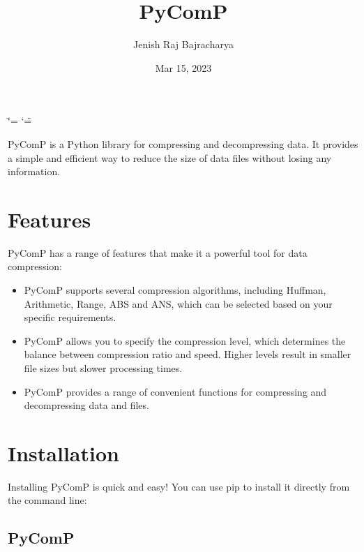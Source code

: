 \documentclass[letterpaper,10pt,english]{sphinxmanual}
\title{PyComP}
\date{Mar 15, 2023}
\author{Jenish Raj Bajracharya}
\begin{document}
\ifdefined\shorthandoff
  \ifnum\catcode`\=\string=\active\shorthandoff{=}\fi
  \ifnum\catcode`\"=\active{}\fi
\fi

\pagestyle{empty}
\sphinxmaketitle
\pagestyle{plain}
\sphinxtableofcontents
\pagestyle{normal}
\label{\detokenize{index::doc}}


\sphinxAtStartPar
PyComP is a Python library for compressing and decompressing data. It provides a simple and efficient way to reduce the size of data files without losing any information.


\chapter{Features}
\label{\detokenize{index:features}}
\sphinxAtStartPar
PyComP has a range of features that make it a powerful tool for data compression:
\begin{itemize}
\item {} 
\sphinxAtStartPar
{} PyComP supports several compression algorithms, including Huffman, Arithmetic, Range, ABS and ANS, which can be selected based on your specific requirements.

\item {} 
\sphinxAtStartPar
{} PyComP allows you to specify the compression level, which determines the balance between compression ratio and speed. Higher levels result in smaller file sizes but slower processing times.

\item {} 
\sphinxAtStartPar
{} PyComP provides a range of convenient functions for compressing and decompressing data and files.

\end{itemize}


\chapter{Installation}
\label{\detokenize{index:installation}}
\sphinxAtStartPar
Installing PyComP is quick and easy! You can use pip to install it directly from the command line:

\sphinxstepscope


\section{PyComP}
\label{\detokenize{modules:pycomp}}\label{\detokenize{modules::doc}}
\sphinxstepscope
\end{document}

